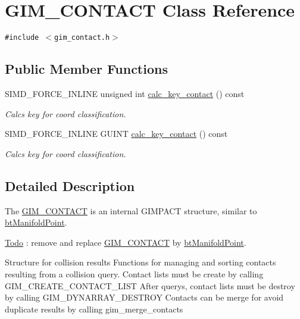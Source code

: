 \hypertarget{class_g_i_m___c_o_n_t_a_c_t}{
\section{GIM\_\-CONTACT Class Reference}
\label{class_g_i_m___c_o_n_t_a_c_t}
}
{\tt \#include $<$gim\_\-contact.h$>$}

\subsection*{Public Member Functions}
\begin{CompactItemize}
\item 
\hypertarget{class_g_i_m___c_o_n_t_a_c_t_61fafe1bf77bfc847c7fedee96ce215f}{
SIMD\_\-FORCE\_\-INLINE unsigned int \hyperlink{class_g_i_m___c_o_n_t_a_c_t_61fafe1bf77bfc847c7fedee96ce215f}{calc\_\-key\_\-contact} () const }
\label{class_g_i_m___c_o_n_t_a_c_t_61fafe1bf77bfc847c7fedee96ce215f}

\begin{CompactList}\small\item\em Calcs key for coord classification. \item\end{CompactList}\item 
\hypertarget{class_g_i_m___c_o_n_t_a_c_t_d8110f809b61009ed8424e25f7ae9f78}{
SIMD\_\-FORCE\_\-INLINE GUINT \hyperlink{class_g_i_m___c_o_n_t_a_c_t_d8110f809b61009ed8424e25f7ae9f78}{calc\_\-key\_\-contact} () const }
\label{class_g_i_m___c_o_n_t_a_c_t_d8110f809b61009ed8424e25f7ae9f78}

\begin{CompactList}\small\item\em Calcs key for coord classification. \item\end{CompactList}\end{CompactItemize}


\subsection{Detailed Description}
The \hyperlink{class_g_i_m___c_o_n_t_a_c_t}{GIM\_\-CONTACT} is an internal GIMPACT structure, similar to \hyperlink{classbt_manifold_point}{btManifoldPoint}. \begin{Desc}
\item[\hyperlink{todo__todo000025}{Todo}]: remove and replace \hyperlink{class_g_i_m___c_o_n_t_a_c_t}{GIM\_\-CONTACT} by \hyperlink{classbt_manifold_point}{btManifoldPoint}. \end{Desc}
Structure for collision results Functions for managing and sorting contacts resulting from a collision query. Contact lists must be create by calling GIM\_\-CREATE\_\-CONTACT\_\-LIST After querys, contact lists must be destroy by calling GIM\_\-DYNARRAY\_\-DESTROY Contacts can be merge for avoid duplicate results by calling gim\_\-merge\_\-contacts 

